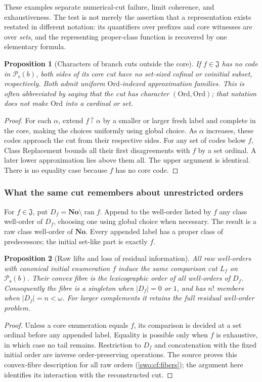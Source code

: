 \documentclass[11pt]{article}
\newtheorem{proposition}[proposition]{Proposition}
\theoremstyle{definition}
\theoremstyle{remark}
\newcommand{\No}{\mathbf{No}}
\newcommand{\Ord}{\mathrm{Ord}}
\newcommand{\Jinj}{\mathfrak J}
\newcommand{\Psupp}{\mathcal P_{\mathrm{s}}}
\newcommand{\ran}{\operatorname{ran}}
\newcommand{\res}{\mathbin{\upharpoonright}}
\begin{document}
These examples separate numerical-cut failure, limit coherence, and
exhaustiveness. The test is not merely the assertion that a representation
exists restated in different notation: its quantifiers over prefixes and
core witnesses are over \emph{sets}, and the representing proper-class
function is recovered by one elementary formula.

\begin{proposition}[Characters of branch cuts outside the core]
\label{swo:gs:prop:class-characters}
If $f\in \Jinj$ has no code in $\Psupp(b)$, both sides of its core cut have no
set-sized cofinal or coinitial subset, respectively. Both admit uniform
$\Ord$-indexed approximation families. This is often abbreviated by
saying that the cut has character $(\Ord,\Ord)$; that notation does not
make $\Ord$ into a cardinal or set.
\end{proposition}
\begin{proof}
For each $\alpha$, extend $f\res\alpha$ by a smaller or larger fresh
label and complete in the core, making the choices uniformly using global
choice. As $\alpha$ increases, these codes approach the cut from their
respective sides. For any set of codes below $f$, Class Replacement bounds
all their first disagreements with $f$ by a set ordinal. A later lower
approximation lies above them all. The upper argument is identical.
There is no equality case because $f$ has no core code.
\end{proof}

\subsubsection{What the same cut remembers about unrestricted orders}
For $f\in \Jinj$, put $D_f=\No\setminus\ran f$. Append to the well-order
listed by $f$ any class well-order of $D_f$, choosing one using global
choice when necessary. The result is a raw class well-order of $\No$.
Every appended label has a proper class of predecessors; the initial
set-like part is exactly $f$.

\begin{proposition}[Raw lifts and loss of residual information]
\label{swo:gs:prop:raw-lifts}
All raw well-orders with canonical initial enumeration $f$ induce the
same comparison cut $L_f$ on $\Psupp(b)$. Their convex fibre is the
lexicographic order of all well-orders of $D_f$. Consequently the fibre
is a singleton when $|D_f|=0$ or $1$, and has $n!$ members when
$|D_f|=n<\omega$. For larger complements it retains the full residual
well-order problem.
\end{proposition}
\begin{proof}
Unless a core enumeration equals $f$, its comparison is decided at a set
ordinal before any appended label. Equality is possible only when $f$ is
exhaustive, in which case no tail remains. Restriction to $D_f$ and
concatenation with the fixed initial order are inverse order-preserving
operations. The source proves this convex-fibre description for all
raw orders (\cref{swo:cf:fibers}); the argument here identifies
its interaction with the reconstructed cut.
\end{proof}
\end{document}
